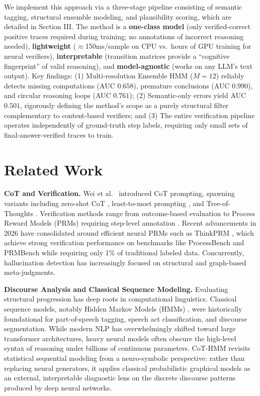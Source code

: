 \documentclass[conference]{IEEEtran}
\begin{document}
We implement this approach via a three-stage pipeline consisting of semantic tagging, structural ensemble modeling, and plausibility scoring, which are detailed in Section III. The method is a \textbf{one-class model} (only verified-correct positive traces required during training; no annotations of incorrect reasoning needed), \textbf{lightweight} ($\approx$150ms/sample on CPU vs.\ hours of GPU training for neural verifiers), \textbf{interpretable} (transition matrices provide a ``cognitive fingerprint'' of valid reasoning), and \textbf{model-agnostic} (works on any LLM's text output). Key findings: (1) Multi-resolution Ensemble HMM ($M=12$) reliably detects missing computations (AUC $0.658$), premature conclusions (AUC $0.990$), and circular reasoning loops (AUC $0.761$); (2) Semantic-only errors yield AUC $0.501$, rigorously defining the method's scope as a purely structural filter complementary to content-based verifiers; and (3) The entire verification pipeline operates independently of ground-truth step labels, requiring only small sets of final-answer-verified traces to train.

\section{Related Work}

\textbf{CoT and Verification.} Wei et al.\ \cite{wei2022chain} introduced CoT prompting, spawning variants including zero-shot CoT \cite{kojima2022large}, least-to-most prompting \cite{zhou2023least}, and Tree-of-Thoughts \cite{yao2023tree}. Verification methods range from outcome-based evaluation to Process Reward Models (PRMs) requiring step-level annotation \cite{lightman2024let, wang-etal-2024-math-shepherd}. Recent advancements in 2026 have consolidated around efficient neural PRMs such as ThinkPRM \cite{khalifa2025}, which achieve strong verification performance on benchmarks like ProcessBench and PRMBench while requiring only 1\% of traditional labeled data. Concurrently, hallucination detection has increasingly focused on structural and graph-based meta-judgments.

\textbf{Discourse Analysis and Classical Sequence Modeling.} Evaluating structural progression has deep roots in computational linguistics. Classical sequence models, notably Hidden Markov Models (HMMs) \cite{rabiner1989tutorial}, were historically foundational for part-of-speech tagging, speech act classification, and discourse segmentation. While modern NLP has overwhelmingly shifted toward large transformer architectures, heavy neural models often obscure the high-level syntax of reasoning under billions of continuous parameters. CoT-HMM revisits statistical sequential modeling from a neuro-symbolic perspective: rather than replacing neural generators, it applies classical probabilistic graphical models as an external, interpretable diagnostic lens on the discrete discourse patterns produced by deep neural networks.
\end{document}

